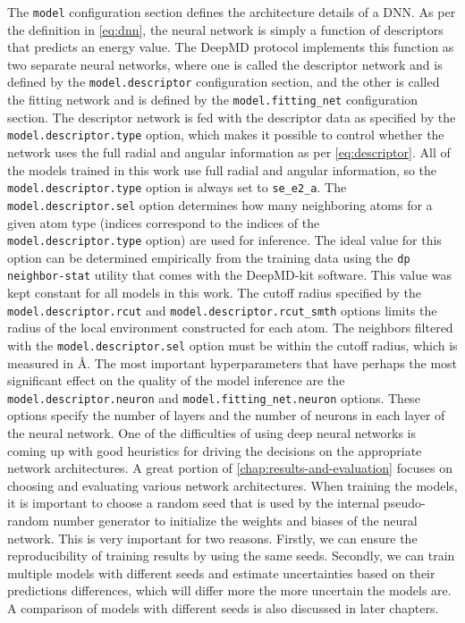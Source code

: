 The \texttt{model} configuration section defines the architecture details of
a DNN. As per the definition in \eqref{eq:dnn}, the neural network is simply a
function of descriptors that predicts an energy value. The DeepMD
protocol implements this function as two separate neural networks,
where one is called the descriptor network and is defined by the
\texttt{model.descriptor} configuration section, and the other is called the
fitting network and is defined by the \texttt{model.fitting\_net}
configuration section. The descriptor network is fed with the descriptor data
as specified by the \texttt{model.descriptor.type} option, which makes it
possible to control whether the network uses the full radial and angular
information as per \eqref{eq:descriptor}. All of the models trained in this
work use full radial and angular information, so the
\texttt{model.descriptor.type} option is always set to \texttt{se\_e2\_a}.
The \texttt{model.descriptor.sel} option determines how many neighboring atoms
for a given atom type (indices correspond to the indices of the
\texttt{model.descriptor.type} option) are used for inference. The ideal value
for this option can be determined empirically from the training data using the
\texttt{dp neighbor-stat} utility that comes with the DeepMD-kit software.
This value was kept constant for all models in this work. The cutoff radius
specified by the \texttt{model.descriptor.rcut} and
\texttt{model.descriptor.rcut\_smth} options limits the radius of the local
environment constructed for each atom. The neighbors filtered with the
\texttt{model.descriptor.sel} option must be within the cutoff radius, which
is measured in \AA. The most important hyperparameters that have perhaps the
most significant effect on the quality of the model inference are
the \texttt{model.descriptor.neuron} and \texttt{model.fitting\_net.neuron}
options. These options specify the number of layers and the number of neurons
in each layer of the neural network. One of the difficulties of using deep neural
networks is coming up with good heuristics for driving the decisions on the
appropriate network architectures. A great portion of
\autoref{chap:results-and-evaluation} focuses on choosing and evaluating
various network architectures. When training the models, it is important to
choose a random seed that is used by the internal pseudo-random number
generator to initialize the weights and biases of the neural network. This is
very important for two reasons. Firstly, we can ensure the reproducibility of
training results by using the same seeds. Secondly, we can train multiple
models with different seeds and estimate uncertainties based on their
predictions differences, which will differ more the more uncertain the models
are. A comparison of models with different seeds is also discussed in later
chapters.

